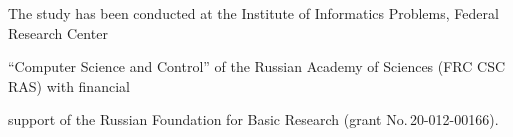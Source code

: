 


















\vspace*{-15pt}





\Ack


\noindent


The study has been conducted at the Institute of Informatics Problems, Federal Research Center 


``Computer Science and Control'' of the Russian Academy of Sciences (FRC CSC RAS) with financial 


support of the Russian Foundation for Basic Research (grant No.\,20-012-00166).







